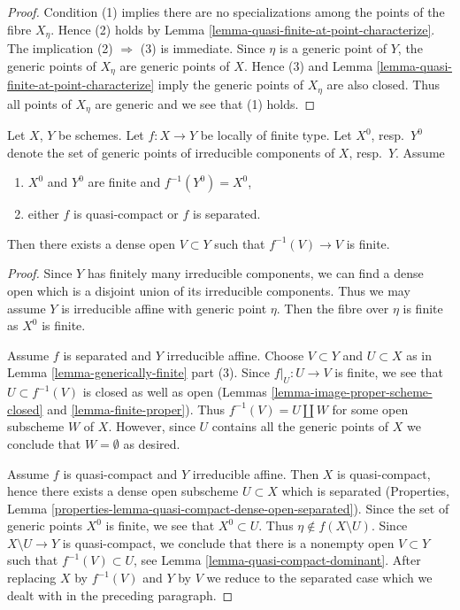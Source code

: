 \begin{proof}
Condition (1) implies there are no specializations among the points
of the fibre $X_\eta$. Hence (2) holds by
Lemma \ref{lemma-quasi-finite-at-point-characterize}.
The implication (2) $\Rightarrow$ (3) is immediate.
Since $\eta$ is a generic point of $Y$, the generic points of $X_\eta$
are generic points of $X$. Hence (3) and 
Lemma \ref{lemma-quasi-finite-at-point-characterize}
imply the generic points of $X_\eta$ are also closed.
Thus all points of $X_\eta$ are generic and we see that (1) holds.
\end{proof}

\begin{lemma}
\label{lemma-finite-over-dense-open}
Let $X$, $Y$ be schemes. Let $f : X \to Y$ be locally of finite type.
Let $X^0$, resp.\ $Y^0$ denote the set of generic points of irreducible
components of $X$, resp.\ $Y$. Assume
\begin{enumerate}
\item $X^0$ and $Y^0$ are finite and $f^{-1}(Y^0) = X^0$,
\item either $f$ is quasi-compact or $f$ is separated.
\end{enumerate}
Then there exists a dense open $V \subset Y$
such that $f^{-1}(V) \to V$ is finite.
\end{lemma}

\begin{proof}
Since $Y$ has finitely many irreducible components, we can find a dense
open which is a disjoint union of its irreducible components. Thus we may
assume $Y$ is irreducible affine with generic point $\eta$. Then the fibre
over $\eta$ is finite as $X^0$ is finite.

\medskip\noindent
Assume $f$ is separated and $Y$ irreducible affine. Choose $V \subset Y$
and $U \subset X$ as in Lemma \ref{lemma-generically-finite} part (3).
Since $f|_U : U \to V$ is finite, we see that $U \subset f^{-1}(V)$
is closed as well as open (Lemmas \ref{lemma-image-proper-scheme-closed} and
\ref{lemma-finite-proper}). Thus $f^{-1}(V) = U \amalg W$ for some
open subscheme $W$ of $X$. However, since $U$ contains all the generic
points of $X$ we conclude that $W = \emptyset$ as desired.

\medskip\noindent
Assume $f$ is quasi-compact and $Y$ irreducible affine. Then $X$ is
quasi-compact, hence there exists a dense open subscheme $U \subset X$
which is separated
(Properties, Lemma \ref{properties-lemma-quasi-compact-dense-open-separated}).
Since the set of generic points $X^0$ is finite, we see that $X^0 \subset U$.
Thus $\eta \not \in f(X \setminus U)$. Since $X \setminus U \to Y$ is
quasi-compact, we conclude that there is a nonempty open $V \subset Y$
such that $f^{-1}(V) \subset U$, see Lemma \ref{lemma-quasi-compact-dominant}.
After replacing $X$ by $f^{-1}(V)$ and $Y$ by $V$ we reduce to the
separated case which we dealt with in the preceding paragraph.
\end{proof}

